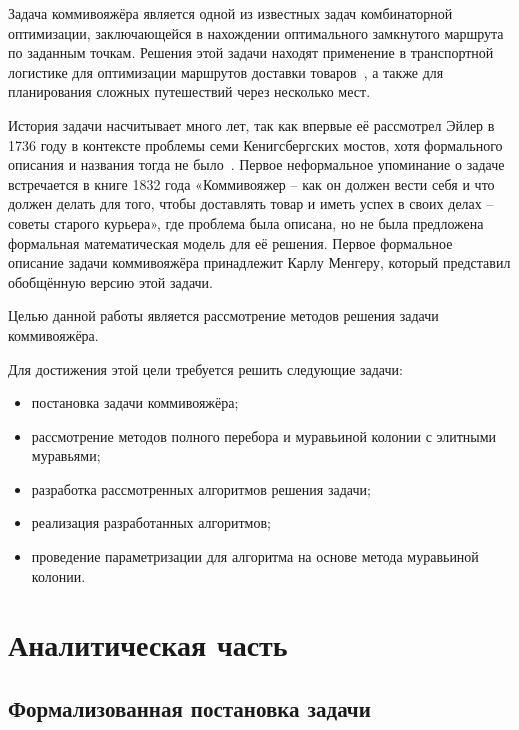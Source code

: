 

Задача коммивояжёра является одной из известных задач комбинаторной оптимизации, заключающейся в нахождении оптимального замкнутого маршрута по заданным точкам. Решения этой задачи находят применение в транспортной логистике для оптимизации маршрутов доставки товаров~\cite{volodina}, а также для планирования сложных путешествий через несколько мест.~\cite{voronin}

История задачи насчитывает много лет, так как впервые её рассмотрел Эйлер в 1736 году в контексте проблемы семи Кенигсбергских мостов, хотя формального описания и названия тогда не было~\cite{sovet}. Первое неформальное упоминание о задаче встречается в книге 1832 года «Коммивояжер – как он должен вести себя и что должен делать для того, чтобы доставлять товар и иметь успех в своих делах – советы старого курьера», где проблема была описана, но не была предложена формальная математическая модель для её решения. Первое формальное описание задачи коммивояжёра принадлежит Карлу Менгеру, который представил обобщённую версию этой задачи.~\cite{schrijver}

Целью данной работы является рассмотрение методов решения задачи коммивояжёра.

Для достижения этой цели требуется решить следующие задачи:

\begin{itemize}
	\item постановка задачи коммивояжёра;
	\item рассмотрение методов полного перебора и муравьиной колонии с элитными муравьями;
	\item разработка рассмотренных алгоритмов решения задачи;
	\item реализация разработанных алгоритмов;
	\item проведение параметризации для алгоритма на основе метода муравьиной колонии. 
\end{itemize}

\chapter{Аналитическая часть}

\section{Формализованная постановка задачи}

